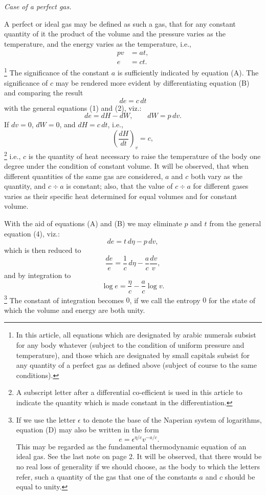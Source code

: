 \documentclass[11pt]{article}
\begin{document}
\begin{center}
\itshape Case of a perfect gas.
\end{center}

A perfect or ideal gas may be defined as such a gas, that for any constant quantity of it the product of the volume and the pressure varies as the temperature, and the energy varies as the temperature, i.e.,
\begin{align}
pv&=at, \tag{A}\\
e&=ct. \tag{B}
\end{align}
\footnote{In this article, all equations which are designated by arabic numerals subsist for any body whatever (subject to the condition of uniform pressure and temperature), and those which are designated by small capitals subsist for any quantity of a perfect gas as defined above (subject of course to the same conditions).}
The significance of the constant $a$ is sufficiently indicated by equation (A). The significance of $c$ may be rendered more evident by differentiating equation (B) and comparing the result
\[
de=c\,dt
\]
with the general equations (1) and (2), viz.:
\[
de=dH-dW,\qquad dW=p\,dv.
\]
If $dv=0$, $dW=0$, and $dH=c\,dt$, i.e.,
\begin{equation}
\left(\frac{dH}{dt}\right)_v=c,\tag{C}
\end{equation}
\footnote{A subscript letter after a differential co-efficient is used in this article to indicate the quantity which is made constant in the differentiation.}
i.e., $c$ is the quantity of heat necessary to raise the temperature of the body one degree under the condition of constant volume. It will be observed, that when different quantities of the same gas are considered, $a$ and $c$ both vary as the quantity, and $c\div a$ is constant; also, that the value of $c\div a$ for different gases varies as their specific heat determined for equal volumes and for constant volume.

With the aid of equations (A) and (B) we may eliminate $p$ and $t$ from the general equation (4), viz.:
\[
de=t\,d\eta-p\,dv,
\]
which is then reduced to
\[
\frac{de}{e}=\frac{1}{c}\,d\eta-\frac{a}{c}\frac{dv}{v},
\]
and by integration to
\begin{equation}
\log e=\frac{\eta}{c}-\frac{a}{c}\log v.\tag{D}
\end{equation}
\footnote{If we use the letter $\epsilon$ to denote the base of the Naperian system of logarithms, equation (D) may also be written in the form
\[
e=\epsilon^{\eta/c}v^{-a/c}.
\]
This may be regarded as the fundamental thermodynamic equation of an ideal gas. See the last note on page 2. It will be observed, that there would be no real loss of generality if we should choose, as the body to which the letters refer, such a quantity of the gas that one of the constants $a$ and $c$ should be equal to unity.}
The constant of integration becomes $0$, if we call the entropy $0$ for the state of which the volume and energy are both unity.
\end{document}
